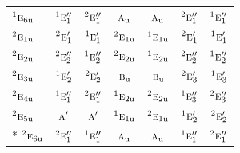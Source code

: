 \documentclass[10pt,a4paper]{article}
\numberwithin{equation}{section}
\newcommand{\irr}[1]{\text{\normalfont\scshape #1}}
\newcommand{\conjpair}[1]{{}^{#1}}
\newcommand{\ptag}[1]{\mathrm{#1}}
\begin{document}
{\begin{longtable}{@{}lcccccc@{}}
$\conjpair{1}\irr{e}_{6\ptag{u}}$ & $\conjpair{1}\irr{e}_{1}''$ & $\conjpair{2}\irr{e}_{1}''$ & $\irr{a}_{\ptag{u}}$ & $\irr{a}_{\ptag{u}}$ & $\conjpair{2}\irr{e}_{1}''$ & $\conjpair{1}\irr{e}_{1}''$\\
$\conjpair{2}\irr{e}_{1\ptag{u}}$ & $\conjpair{2}\irr{e}_{1}'$ & $\conjpair{1}\irr{e}_{1}'$ & $\conjpair{2}\irr{e}_{1\ptag{u}}$ & $\conjpair{1}\irr{e}_{1\ptag{u}}$ & $\conjpair{2}\irr{e}_{1}'$ & $\conjpair{1}\irr{e}_{1}'$\\
$\conjpair{2}\irr{e}_{2\ptag{u}}$ & $\conjpair{2}\irr{e}_{2}''$ & $\conjpair{1}\irr{e}_{2}''$ & $\conjpair{2}\irr{e}_{2\ptag{u}}$ & $\conjpair{1}\irr{e}_{2\ptag{u}}$ & $\conjpair{2}\irr{e}_{2}''$ & $\conjpair{1}\irr{e}_{2}''$\\
$\conjpair{2}\irr{e}_{3\ptag{u}}$ & $\conjpair{1}\irr{e}_{2}'$ & $\conjpair{2}\irr{e}_{2}'$ & $\irr{b}_{\ptag{u}}$ & $\irr{b}_{\ptag{u}}$ & $\conjpair{2}\irr{e}_{3}'$ & $\conjpair{1}\irr{e}_{3}'$\\
$\conjpair{2}\irr{e}_{4\ptag{u}}$ & $\conjpair{1}\irr{e}_{1}''$ & $\conjpair{2}\irr{e}_{1}''$ & $\conjpair{1}\irr{e}_{2\ptag{u}}$ & $\conjpair{2}\irr{e}_{2\ptag{u}}$ & $\conjpair{1}\irr{e}_{3}''$ & $\conjpair{2}\irr{e}_{3}''$\\
$\conjpair{2}\irr{e}_{5\ptag{u}}$ & $\irr{a}'$ & $\irr{a}'$ & $\conjpair{1}\irr{e}_{1\ptag{u}}$ & $\conjpair{2}\irr{e}_{1\ptag{u}}$ & $\conjpair{1}\irr{e}_{2}'$ & $\conjpair{2}\irr{e}_{2}'$\\*
$\conjpair{2}\irr{e}_{6\ptag{u}}$ & $\conjpair{2}\irr{e}_{1}''$ & $\conjpair{1}\irr{e}_{1}''$ & $\irr{a}_{\ptag{u}}$ & $\irr{a}_{\ptag{u}}$ & $\conjpair{1}\irr{e}_{1}''$ & $\conjpair{2}\irr{e}_{1}''$\\
\bottomrule\end{longtable}}
\end{document}
